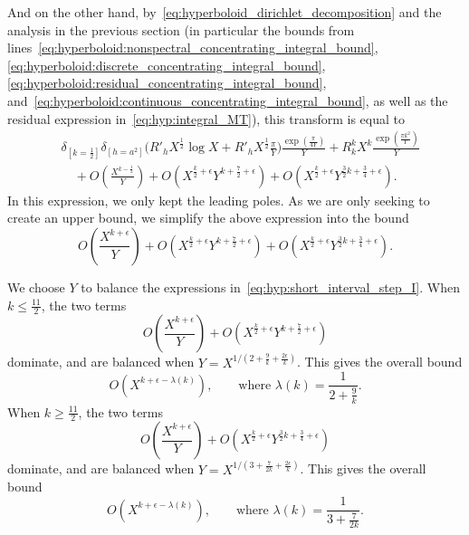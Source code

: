 And on the other hand, by~\eqref{eq:hyperboloid_dirichlet_decomposition} and the analysis
in the previous section (in particular the bounds from
lines~\eqref{eq:hyperboloid:nonspectral_concentrating_integral_bound},
\eqref{eq:hyperboloid:discrete_concentrating_integral_bound},
\eqref{eq:hyperboloid:residual_concentrating_integral_bound},
and~\eqref{eq:hyperboloid:continuous_concentrating_integral_bound}, as well as the
residual expression in~\eqref{eq:hyp:integral_MT}), this transform is
equal to
\begin{align}
  &\delta_{[k = \frac{1}{2}]} \delta_{[h = a^2]} \bigg(R'_h X^{\frac{1}{2}}\log X +R'_h
X^{\frac{1}{2}} \frac{\pi}{Y} \bigg)\frac{\exp(\frac{\pi}{4Y})}{Y} + R_k^k X^k
\frac{\exp(\frac{\pi k^2}{Y})}{Y} \\
  &\quad + O(\frac{X^{k-\frac{1}{2}}}{Y}) + O(X^{\frac{k}{2}+\epsilon} Y^{k + \frac{7}{2}
  + \epsilon}) + O(X^{\frac{k}{2} + \epsilon} Y^{\frac{3}{2}k + \frac{3}{4} + \epsilon}).
\end{align}
In this expression, we only kept the leading poles.
As we are only seeking to create an upper bound, we simplify the above expression into the
bound
\begin{equation}\label{eq:hyp:short_interval_step_I}
  O(\frac{X^{k+\epsilon}}{Y}) + O(X^{\frac{k}{2}+\epsilon} Y^{k + \frac{7}{2} + \epsilon})
  + O(X^{\frac{k}{2} + \epsilon} Y^{\frac{3}{2}k + \frac{3}{4} + \epsilon}).
\end{equation}


We choose $Y$ to balance the expressions in~\eqref{eq:hyp:short_interval_step_I}.
When $k \leq \frac{11}{2}$, the two terms
\begin{equation}
  O(\frac{X^{k+\epsilon}}{Y}) + O(X^{\frac{k}{2} + \epsilon} Y^{k + \frac{7}{2} +
  \epsilon})
\end{equation}
dominate, and are balanced when $Y = X^{1/(2 + \frac{9}{k} + \frac{2\epsilon}{k})}$.
This gives the overall bound
\begin{equation}\label{eq:hyp:short_interval_bound_smallk}
  O(X^{k + \epsilon - \lambda(k)}), \qquad \text{where } \lambda(k) = \frac{1}{2 +
  \frac{9}{k}}.
\end{equation}
When $k \geq \frac{11}{2}$, the two terms
\begin{equation}
  O(\frac{X^{k+\epsilon}}{Y}) + O(X^{\frac{k}{2} + \epsilon} Y^{\frac{3}{2} k +
  \frac{3}{4} + \epsilon})
\end{equation}
dominate, and are balanced when $Y = X^{1/(3 + \frac{7}{2k} + \frac{2\epsilon}{k})}$.
This gives the overall bound
\begin{equation}\label{eq:hyp:short_interval_bound_largek}
  O(X^{k + \epsilon - \lambda(k)}), \qquad \text{where } \lambda(k) = \frac{1}{3 +
  \frac{7}{2k}}.
\end{equation}


